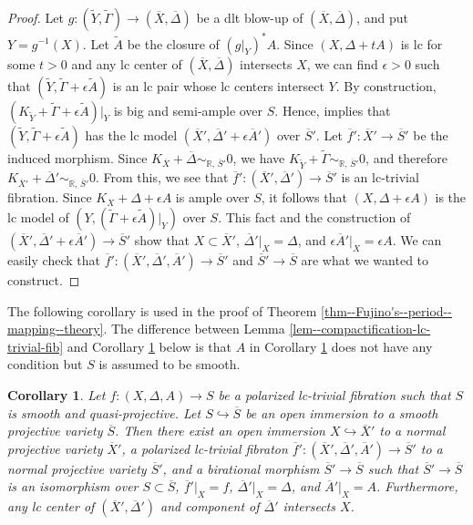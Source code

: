 \documentclass[12pt,twoside]{amsart}
\newtheorem{cor}[thm]{Corollary}
\theoremstyle{definition}
\begin{document}
\begin{proof}
Let $g \colon (\tilde{Y},\tilde{\Gamma}) \to (\overline{X},\overline{\Delta})$ be a dlt blow-up of $(\overline{X},\overline{\Delta})$, and put $Y = g^{-1}(X)$. 
Let $\tilde{A}$ be the closure of $(g|_{Y})^{*}A$. 
Since $(X,\Delta+tA)$ is lc for some $t>0$ and any lc center of $(\overline{X},\overline{\Delta})$ intersects $X$, we can find $\epsilon>0$ such that $(\tilde{Y},\tilde{\Gamma}+\epsilon \tilde{A})$ is an lc pair whose lc centers intersect $Y$.  
By construction, $(K_{\tilde{Y}}+\tilde{\Gamma}+\epsilon \tilde{A})|_{Y}$ is big and semi-ample over $S$. 
Hence, \cite[Theorem 1.2]{has-mmp} implies that $(\tilde{Y},\tilde{\Gamma}+\epsilon \tilde{A})$ has the lc model $(\overline{X}',\overline{\Delta}'+\epsilon\overline{A}')$ over $\overline{S}'$. 
Let $\overline{f}'\colon \overline{X}' \to \overline{S}'$ be the induced morphism. 
Since $K_{\overline{X}}+\overline{\Delta} \sim_{\mathbb{R},\,\overline{S}'}0$, we have $K_{\tilde{Y}}+\tilde{\Gamma} \sim_{\mathbb{R},\,\overline{S}'}0$, and therefore $K_{\overline{X}'}+\overline{\Delta}' \sim_{\mathbb{R},\,\overline{S}'}0$. 
From this, we see that $\overline{f}'\colon (\overline{X}',\overline{\Delta}') \to \overline{S}'$ is an lc-trivial fibration. 
Since $K_{X}+\Delta+\epsilon A$ is ample over $S$, it follows that $(X,\Delta+\epsilon A)$ is the lc model of $(Y, (\tilde{\Gamma}+\epsilon \tilde{A})|_{Y})$ over $S$. 
This fact and the construction of $(\overline{X}',\overline{\Delta}'+\epsilon\overline{A}') \to \overline{S}'$ show that $X \subset \overline{X}'$, $\overline{\Delta}'|_{X}=\Delta$, and $\epsilon \overline{A}'|_{X}= \epsilon A$. 
We can easily check that $\overline{f}'\colon (\overline{X}',\overline{\Delta}',\overline{A}') \to \overline{S}'$ and $\overline{S}' \to \overline{S}$ are what we wanted to construct. 
\end{proof}


The following corollary is used in the proof of Theorem \ref{thm--Fujino's--period--mapping--theory}. 
The difference between Lemma \ref{lem--compactification-lc-trivial-fib} and Corollary \ref{cor--compactification-lc-trivial-fib-2} below is that $A$ in Corollary \ref{cor--compactification-lc-trivial-fib-2} does not have any condition but $S$ is assumed to be smooth. 

\begin{cor}\label{cor--compactification-lc-trivial-fib-2}
Let $f\colon (X,\Delta,A)\to S$ be a polarized lc-trivial fibration such that $S$ is smooth and quasi-projective. 
Let $S \hookrightarrow \overline{S}$ be an open immersion to a smooth projective variety $\overline{S}$. 
Then there exist an open immersion $X \hookrightarrow \overline{X}'$ to a normal projective variety $\overline{X}'$, a polarized lc-trivial fibraton $\overline{f}'\colon (\overline{X}',\overline{\Delta}', \overline{A}') \to \overline{S}'$ to a normal projective variety $\overline{S}'$, and a birational morphism $\overline{S}' \to \overline{S}$ such that $\overline{S}' \to \overline{S}$ is an isomorphism over $S \subset \overline{S}$, $\overline{f}'|_{X}=f$, $\overline{\Delta}'|_{X}=\Delta$, and $\overline{A}'|_{X}=A$.  
Furthermore, any lc center of $(\overline{X}',\overline{\Delta}')$ and component of $\overline{\Delta}'$ intersects $X$. 
\end{cor}
\end{document}
